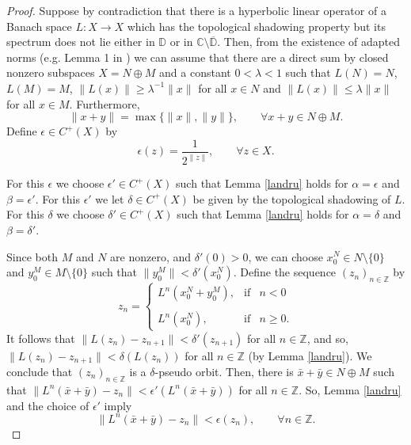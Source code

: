 \documentclass[11pt,letterpaper]{amsart}
\numberwithin{equation}{section}
\begin{document}
\begin{proof}
Suppose by contradiction that there is a hyperbolic linear operator of a Banach space $L:X\to X$ which has the topological shadowing property
but its spectrum does not lie either in $\mathbb{D}$ or in $\mathbb{C}\setminus \overline{\mathbb{D}}$.
Then, from the existence of adapted norms (e.g. Lemma 1 in \cite{eh}) we can assume that there are a direct sum by closed nonzero subspaces $X=N\oplus M$ and a constant $0<\lambda<1$ such that
$L(N)=N$, $L(M)=M$,
$\|L(x)\|\geq \lambda^{-1} \|x\|$ for all $x\in N$ and $\|L(x)\|\leq\lambda\|x\|$ for all $x\in M$.
Furthermore,
$$
\|x+y\|=\max\{\|x\|,\|y\|\},\quad\quad\forall x+y\in N\oplus M.
$$
Define $\epsilon\in C^+(X)$ by
$$
\epsilon(z)=\frac{1}{2^{\|z\|}},\quad\quad\forall z\in X.
$$

For this $\epsilon$ we choose $\epsilon'\in C^+(X)$ such that Lemma \ref{landru} holds for $\alpha=\epsilon$ and $\beta=\epsilon'$.
For this $\epsilon'$ we let $\delta\in C^+(X)$ be given by the topological shadowing of $L$.
For this $\delta$ we choose $\delta'\in C^+(X)$ such that Lemma \ref{landru}
holds for $\alpha=\delta$ and $\beta=\delta'$.

Since both $M$ and $N$ are nonzero, and $\delta'(0)>0$, we can choose
$x_0^N\in N\setminus\{0\}$ and $y_0^M\in M\setminus \{0\}$ such that
$\|y^M_0\|<\delta'(x_0^N)$.
Define the sequence $(z_n)_{n\in\mathbb{Z}}$ by
$$
z_n= \left\{
\begin{array}{rcl}
L^n(x_0^N+y_0^M),  & \mbox{if} & n<0\\
& & \\
L^n(x_0^N),& \mbox{if} & n\geq0.
\end{array}
\right.
$$
It follows that
$\|L(z_n)-z_{n+1}\|<\delta'(z_{n+1})$ for all $n\in\mathbb{Z}$, and so,
$\|L(z_n)-z_{n+1}\|<\delta(L(z_n))$ for all $n\in\mathbb{Z}$ (by Lemma \ref{landru}).
We conclude that $(z_n)_{n\in\mathbb{Z}}$ is a $\delta$-pseudo orbit. Then,
there is $\bar{x}+\bar{y}\in N\oplus M$ such that
$\|L^n(\bar{x}+\bar{y})-z_n\|<\epsilon'(L^n(\bar{x}+\bar{y}))$ for all
$n\in\mathbb{Z}$.
So, Lemma \ref{landru} and the choice of $\epsilon'$ imply
\begin{equation}
\label{pupa}
\|L^n(\bar{x}+\bar{y})-z_n\|<\epsilon(z_n),\quad\quad\forall
n\in\mathbb{Z}.
\end{equation}


\end{proof}
\end{document}
